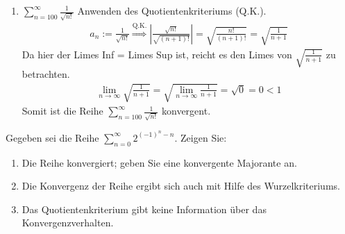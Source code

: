 \begin{lsg}
\begin{enumerate}[label=$\mathrm{(\roman*)}$, ref=$\mathrm{\roman*}$]
\item $\sum^{\infty}_{n=100}\frac{1}{\sqrt{n!}}$ Anwenden des Quotientenkriteriums (Q.K.).
\begin{align*}
a_n:=\frac{1}{\sqrt{n!}} \overset{\text{Q.K.}}{\Longrightarrow} \left|\frac{\sqrt{n!}}{\sqrt{(n+1)!}}\right| = \sqrt{\frac{n!}{(n+1)!}}= \sqrt{\frac{1}{n+1}}
\end{align*}
Da hier der Limes Inf = Limes Sup ist, reicht es den Limes von $\sqrt{\frac{1}{n+1}}$ zu betrachten.
\begin{align*}
\lim_{n \to \infty} \sqrt{\frac{1}{n+1}} = \sqrt{\lim_{n \to \infty} \frac{1}{n+1}} = \sqrt{0} = 0 < 1
\end{align*}
Somit ist die Reihe $\sum^{\infty}_{n=100}\frac{1}{\sqrt{n!}}$ konvergent.
\end{enumerate}
\end{lsg}

\bigskip

\begin{aufg}[6 Punkte]
Gegeben sei die Reihe $\sum\limits_{n=0}^\infty 2^{(-1)^n-n}$. Zeigen Sie:
\begin{enumerate}[label=$\mathrm{(\roman*)}$, ref=$\mathrm{\roman*}$]
\item Die Reihe konvergiert; geben Sie eine konvergente Majorante an.
\item Die Konvergenz der Reihe ergibt sich auch mit Hilfe des Wurzelkriteriums.
\item Das Quotientenkriterium gibt keine Information \"uber das Konvergenzverhalten.
\end{enumerate}
\end{aufg}
 
\bigskip

